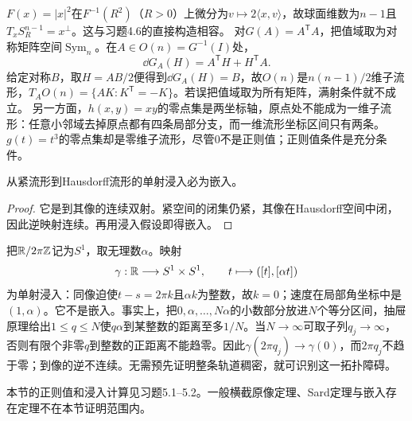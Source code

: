 \begin{example}[球面、矩阵群与奇异方程]
$F(x)=|x|^2$在$F^{-1}(R^2)$（$R>0$）上微分为$v\mapsto2\langle x,v\rangle$，故球面维数为$n-1$且$T_xS_R^{n-1}=x^\perp$。这与习题4.6的直接构造相容。
对$G(A)=A^{\mathsf T}A$，把值域取为对称矩阵空间$\operatorname{Sym}_n$。在$A\in O(n)=G^{-1}(I)$处，
\[
 \dd G_A(H)=A^{\mathsf T}H+H^{\mathsf T}A.
\]
给定对称$B$，取$H=AB/2$便得到$\dd G_A(H)=B$，故$O(n)$是$n(n-1)/2$维子流形，$T_AO(n)=\{AK:K^{\mathsf T}=-K\}$。若误把值域取为所有矩阵，满射条件就不成立。
另一方面，$h(x,y)=xy$的零点集是两坐标轴，原点处不能成为一维子流形：任意小邻域去掉原点都有四条局部分支，而一维流形坐标区间只有两条。$g(t)=t^3$的零点集却是零维子流形，尽管$0$不是正则值；正则值条件是充分条件。
\end{example}
\begin{proposition}[紧源与嵌入]\label{prop:compact-embedding}
从紧流形到Hausdorff流形的单射浸入必为嵌入。
\end{proposition}
\begin{proof}
它是到其像的连续双射。紧空间的闭集仍紧，其像在Hausdorff空间中闭，因此逆映射连续。再用浸入假设即得嵌入。
\end{proof}
\begin{example}[单射浸入的逆不一定连续]\label{ex:irrational-immersion}
把$\mathbb{R}/2\pi\mathbb Z$记为$S^1$，取无理数$\alpha$。映射
\[
 \gamma:\mathbb{R}\longrightarrow S^1\times S^1,\qquad
 t\longmapsto([t],[\alpha t])
\]
为单射浸入：同像迫使$t-s=2\pi k$且$\alpha k$为整数，故$k=0$；速度在局部角坐标中是$(1,\alpha)$。它不是嵌入。事实上，把$0,\alpha,\ldots,N\alpha$的小数部分放进$N$个等分区间，抽屉原理给出$1\leq q\leq N$使$q\alpha$到某整数的距离至多$1/N$。当$N\to\infty$可取子列$q_j\to\infty$，否则有限个非零$q$到整数的正距离不能趋零。因此$\gamma(2\pi q_j)\to\gamma(0)$，而$2\pi q_j$不趋于零；到像的逆不连续。无需预先证明整条轨道稠密，就可识别这一拓扑障碍。
\end{example}
本节的正则值和浸入计算见习题5.1--5.2。一般横截原像定理、Sard定理与嵌入存在定理不在本节证明范围内。
